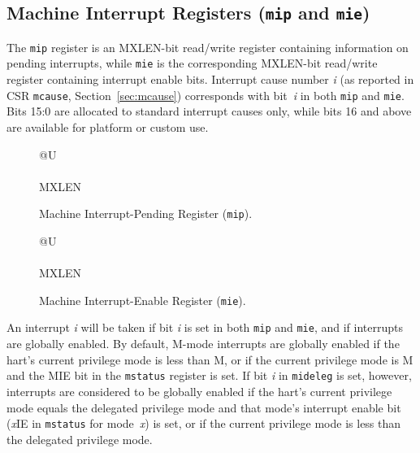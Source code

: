 \subsection{Machine Interrupt Registers ({\tt mip} and {\tt mie})}

The {\tt mip} register is an MXLEN-bit read/write register containing
information on pending interrupts, while {\tt mie} is the
corresponding MXLEN-bit read/write register containing interrupt enable
bits.
Interrupt cause number \textit{i} (as reported in CSR {\tt mcause},
Section~\ref{sec:mcause}) corresponds with bit~\textit{i} in both
{\tt mip} and {\tt mie}.
Bits 15:0 are allocated to standard interrupt causes only, while bits 16
and above are available for platform or custom use.

\begin{figure}[h!]
{\footnotesize
\begin{center}
\begin{tabular}{@{}U}
 \\
\hline
{} \\
\hline
MXLEN \\
\end{tabular}
\end{center}
}
\vspace{-0.1in}
\caption{Machine Interrupt-Pending Register ({\tt mip}).}
\label{mipreg}
\end{figure}

\begin{figure}[h!]
{\footnotesize
\begin{center}
\begin{tabular}{@{}U}
 \\
\hline
{} \\
\hline
MXLEN \\
\end{tabular}
\end{center}
}
\vspace{-0.1in}
\caption{Machine Interrupt-Enable Register ({\tt mie}).}
\label{miereg}
\end{figure}

An interrupt \textit{i} will be taken if bit \textit{i} is set in both
{\tt mip} and {\tt mie}, and if interrupts are globally enabled.  By
default, M-mode interrupts are globally enabled if the hart's current
privilege mode is less than M, or if the current privilege mode is M
and the MIE bit in the {\tt mstatus} register is set.  If bit \textit{i}
in {\tt mideleg} is set, however, interrupts are considered to be
globally enabled if the hart's current privilege mode equals the
delegated privilege mode and that mode's interrupt enable
bit (\textit{x}\/IE in {\tt mstatus} for mode~\textit{x}) is set,
or if the current
privilege mode is less than the delegated privilege mode.

